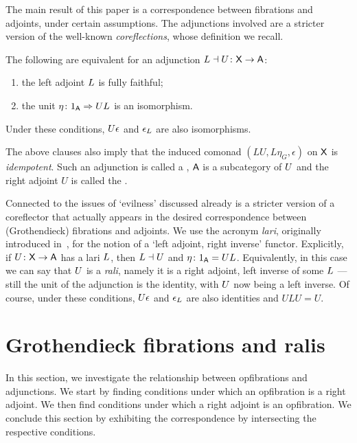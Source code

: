 \documentclass{amsart}
\begin{document}
The main result of this paper is a correspondence between fibrations and adjoints, under certain assumptions. The adjunctions involved are a stricter version of the well-known \emph{coreflections}, whose definition we recall. 

\begin{prop}\label{prop:coreflection}
The following are equivalent for an adjunction $L\dashv U\colon\mathsf{X}\to\mathsf{A}$:
 \begin{enumerate}
  \item the left adjoint $L$ is fully faithful;
  \item the unit $\eta\colon1_{\mathsf{A}}\Rightarrow UL$ is an isomorphism.
 \end{enumerate}
Under these conditions, $U\epsilon$ and $\epsilon_L$ are also isomorphisms.
\end{prop}

The above clauses also imply that the induced comonad $(LU,L\eta_G,\epsilon)$ on $\mathsf{X}$ is \emph{idempotent}. Such an adjunction is called a , $\mathsf{A}$ is a  subcategory of $U$ and the right adjoint $U$ is called the .

Connected to the issues of `evilness' discussed already is a stricter version of a coreflector that actually appears in the desired correspondence between (Gro\-the\-ndi\-eck) fibrations and adjoints.
We use the acronym \emph{lari}, originally introduced in~\cite{Grayfibredandcofibred}, for the notion of a `left adjoint, right inverse' functor. Explicitly, if $U\colon\mathsf{X}\to\mathsf{A}$ has a lari $L$, then $L\dashv U$ and $\eta\colon1_{\mathsf{A}}=UL$. Equivalently, in this case we can say that $U$ is a \emph{rali}, namely it is a right adjoint, left inverse of some $L$ --- still the unit of the adjunction is the identity, with $U$ now being a left inverse. Of course, under these conditions, $U\epsilon$ and $\epsilon_L$ are also identities and $ULU=U$.


\section{Grothendieck fibrations and ralis}
\label{sec:groth-fibs-ralis}

In this section, we investigate the relationship between opfibrations and adjunctions. We start by finding conditions under which an opfibration is a right adjoint.  We then find conditions under which a right adjoint is an opfibration. We conclude this section by exhibiting the correspondence by intersecting the respective conditions.
\end{document}
